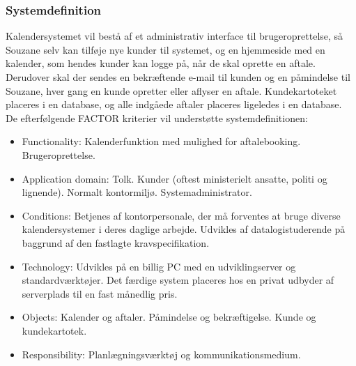 \documentclass[12pt]{article}   %
\begin{document}
\subsubsection{Systemdefinition}
\indent Kalendersystemet vil bestå af et administrativ interface til brugeroprettelse, så Souzane selv kan tilføje nye kunder til systemet, og en hjemmeside med en kalender, som hendes kunder kan logge på, når de skal oprette en aftale. Derudover skal der sendes en bekræftende e-mail til kunden og en påmindelse til Souzane, hver gang en kunde opretter eller aflyser en aftale. Kundekartoteket placeres i en database, og alle indgåede aftaler placeres ligeledes i en database. \\  
\indent De efterfølgende FACTOR kriterier vil understøtte systemdefinitionen:\\

\begin{itemize}[noitemsep,nolistsep]
\item Functionality: Kalenderfunktion med mulighed for aftalebooking. Brugeroprettelse.

\item Application domain: Tolk. Kunder (oftest ministerielt ansatte, politi og lignende). Normalt kontormiljø. Systemadministrator. 

\item Conditions: Betjenes af kontorpersonale, der må forventes at bruge diverse kalendersystemer i deres daglige arbejde. Udvikles af datalogistuderende på baggrund af den fastlagte kravspecifikation. 

\item Technology: Udvikles på en billig PC med en udviklingserver og standardværktøjer. Det færdige system placeres hos en privat udbyder af serverplads til en fast månedlig pris.

\item Objects: Kalender og aftaler. Påmindelse og bekræftigelse. Kunde og kundekartotek. 

\item Responsibility: Planlægningsværktøj og kommunikationsmedium. 

\end{itemize}
\end{document}
